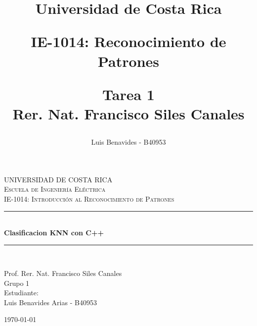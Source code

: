 \documentclass[12pt,letterpaper]{article}
\author{ Luis Benavides - B40953 \\{\small \bigskip \bigskip}}
\title{{ \begin{Huge}Universidad de Costa Rica \\\bigskip \bigskip \bigskip \bigskip \bigskip \end{Huge} IE-1014: Reconocimiento de Patrones  \\\bigskip \bigskip \bigskip \bigskip  }    
Tarea 1 \\\bigskip \bigskip \bigskip \bigskip \bigskip \bigskip \bigskip \bigskip \bigskip \bigskip Rer. Nat. Francisco Siles Canales \bigskip \bigskip \bigskip \bigskip \bigskip}
\begin{document}
  



\begin{titlepage}

\newcommand{\HRule}{\rule{\linewidth}{0.5mm}} %

\center %
 
\textsc{\LARGE UNIVERSIDAD DE COSTA RICA}\\[1.5cm] %
\textsc{\Large Escuela de Ingeniería Eléctrica}\\[0.5cm] %
\textsc{\large IE-1014: Introducción al Reconocimiento de Patrones }\\[0.5cm] %

\bigskip
\bigskip
\bigskip
\bigskip

\HRule \\[0.4cm]
{ \huge \bfseries Clasificacion  KNN con C++ }\\[0.4cm]
\HRule \\[1.5cm]


 

\begin{center} \large
Prof. Rer. Nat. Francisco Siles Canales\\ \bigskip
\bigskip
Grupo 1 \\ \bigskip
\bigskip
\bigskip
Estudiante:\\ 
 Luis Benavides Arias - B40953

 
\end{center}
\bigskip
\bigskip
\bigskip
\bigskip
\bigskip
\bigskip
\bigskip
\bigskip
\bigskip
\bigskip
\bigskip
\bigskip
\bigskip
\bigskip
\bigskip
\normalsize \today \vspace*{5\baselineskip}


\end{titlepage}
\end{document}
